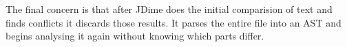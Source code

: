 The final concern is that after JDime does the initial comparision of text and finds conflicts it discards those results. It parses the entire file into an AST and begins analysing it again without knowing which parts differ.   






 
 


